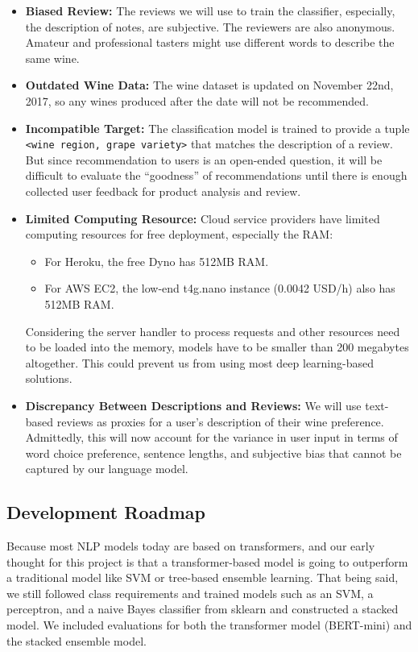 \documentclass[
]{kaohandt}
\begin{document}
\begin{itemize}
	\item \textbf{Biased Review:} The reviews we will use to train the classifier, especially, the description of notes, are subjective. The reviewers are also anonymous. Amateur and professional tasters might use different words to describe the same wine.
	\item \textbf{Outdated Wine Data:} The wine dataset is updated on November 22nd, 2017, so any wines produced after the date will not be recommended.
	\item \textbf{Incompatible Target:} The classification model is trained to provide a tuple \texttt{<wine region, grape variety>} that matches the description of a review. But since recommendation to users is an open-ended question, it will be difficult to evaluate the “goodness” of recommendations until there is enough collected user feedback for product analysis and review.
	\item \textbf{Limited Computing Resource:} Cloud service providers have limited computing resources for free deployment, especially the RAM:
		\begin{itemize}
			\item For Heroku, the free Dyno has 512MB RAM.
			\item For AWS EC2, the low-end t4g.nano instance (0.0042 USD/h) also has 512MB RAM.
		\end{itemize}
		Considering the server handler to process requests and other resources need to be loaded into the memory, models have to be smaller than 200 megabytes altogether. This could prevent us from using most deep learning-based solutions.
	\item \textbf{Discrepancy Between Descriptions and Reviews:} We will use text-based reviews as proxies for a user’s description of their wine preference. Admittedly, this will now account for the variance in user input in terms of word choice preference, sentence lengths, and subjective bias that cannot be captured by our language model.
\end{itemize}

\subsection*{Development Roadmap}

Because most NLP models today are based on transformers, and our early thought for this project is that a transformer-based model is going to outperform a traditional model like SVM or tree-based ensemble learning. That being said, we still followed class requirements and trained models such as an SVM, a perceptron, and a naive Bayes classifier from sklearn and constructed a stacked model. We included evaluations for both the transformer model (BERT-mini) and the stacked ensemble model.
\end{document}
